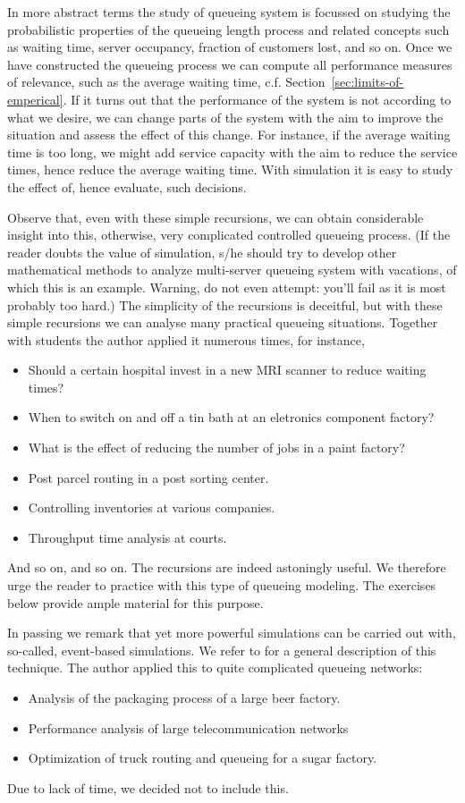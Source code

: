 In more abstract terms the study of queueing system is focussed on
studying the probabilistic properties of the queueing length process
and related concepts such as waiting time, server occupancy, fraction
of customers lost, and so on. Once we have constructed the queueing
process we can compute all performance measures of relevance, such as
the average waiting time,
c.f. Section~\ref{sec:limits-of-emperical}. If it turns out that the
performance of the system is not according to what we desire, we can
change parts of the system with the aim to improve the situation and
assess the effect of this change.  For instance, if the average
waiting time is too long, we might add service capacity with the aim
to reduce the service times, hence reduce the average waiting
time. With simulation it is easy to study the effect of, hence
evaluate, such decisions.

Observe that, even with these simple recursions, we can obtain
considerable insight into this, otherwise, very complicated controlled
queueing process. (If the reader doubts the value of simulation, s/he
should try to develop other mathematical methods to analyze
multi-server queueing system with vacations, of which this is an
example. Warning, do not even attempt: you'll fail as it is most
probably too hard.) The simplicity of the recursions is deceitful, but
with these simple recursions we can analyse many practical queueing
situations. Together with students the author applied it numerous
times, for instance,
\begin{itemize}
\item Should a certain hospital invest in a new MRI scanner to reduce
  waiting times?
\item When to switch on and off a tin bath at an eletronics component factory?
\item What is the effect of reducing the number of jobs in a paint
  factory?
\item Post parcel routing in a post sorting center.
\item Controlling inventories at various companies.
\item Throughput time analysis at courts.
\end{itemize}
And so on, and so on. The recursions are indeed astoningly useful. We
therefore urge the reader to practice with this type of queueing
modeling. The exercises below provide ample material for this purpose.

In passing we remark that yet more powerful simulations can be carried
out with, so-called, event-based simulations. We refer to
\cite[Section 4.5]{hall91:_queuein_method_servic_manuf} for a general
description of this technique. The author applied this to quite complicated queueing networks:
\begin{itemize}
\item Analysis of the packaging process of a large beer factory.
\item Performance analysis of large telecommunication networks
\item Optimization of truck routing and queueing for a sugar factory.
\end{itemize}
Due to lack of time, we decided not to include this. 

